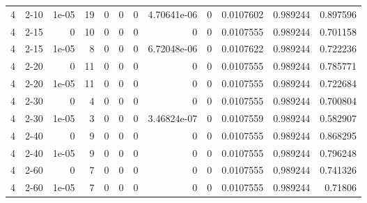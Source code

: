\begin{tabular}{rlrrrrrrrrrr}
     4 & 2-10   &      1e-05 &          19 &                 0 &                 0 &     0           &     4.70641e-06 &      0           &        0.0107602 &               0.989244 &           0.897596 \\
     4 & 2-15   &      0     &          10 &                 0 &                 0 &     0           &     0           &      0           &        0.0107555 &               0.989244 &           0.701158 \\
     4 & 2-15   &      1e-05 &           8 &                 0 &                 0 &     0           &     6.72048e-06 &      0           &        0.0107622 &               0.989244 &           0.722236 \\
     4 & 2-20   &      0     &          11 &                 0 &                 0 &     0           &     0           &      0           &        0.0107555 &               0.989244 &           0.785771 \\
     4 & 2-20   &      1e-05 &          11 &                 0 &                 0 &     0           &     0           &      0           &        0.0107555 &               0.989244 &           0.722684 \\
     4 & 2-30   &      0     &           4 &                 0 &                 0 &     0           &     0           &      0           &        0.0107555 &               0.989244 &           0.700804 \\
     4 & 2-30   &      1e-05 &           3 &                 0 &                 0 &     0           &     3.46824e-07 &      0           &        0.0107559 &               0.989244 &           0.582907 \\
     4 & 2-40   &      0     &           9 &                 0 &                 0 &     0           &     0           &      0           &        0.0107555 &               0.989244 &           0.868295 \\
     4 & 2-40   &      1e-05 &           9 &                 0 &                 0 &     0           &     0           &      0           &        0.0107555 &               0.989244 &           0.796248 \\
     4 & 2-60   &      0     &           7 &                 0 &                 0 &     0           &     0           &      0           &        0.0107555 &               0.989244 &           0.741326 \\
     4 & 2-60   &      1e-05 &           7 &                 0 &                 0 &     0           &     0           &      0           &        0.0107555 &               0.989244 &           0.71806  \\

\end{tabular}

